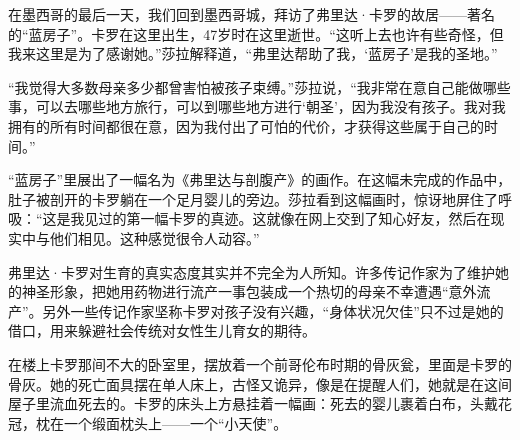 \documentclass[12pt,oneside]{book}
\begin{document}
\begin{bookref}[frametitle={\cite{好好告别}}]
在墨西哥的最后一天，我们回到墨西哥城，拜访了弗里达·卡罗的故居——著名的“蓝房子”。卡罗在这里出生，47岁时在这里逝世。“这听上去也许有些奇怪，但我来这里是为了感谢她。”莎拉解释道，“弗里达帮助了我，‘蓝房子’是我的圣地。”

“我觉得大多数母亲多少都曾害怕被孩子束缚。”莎拉说，“我非常在意自己能做哪些事，可以去哪些地方旅行，可以到哪些地方进行‘朝圣’，因为我没有孩子。我对我拥有的所有时间都很在意，因为我付出了可怕的代价，才获得这些属于自己的时间。”

“蓝房子”里展出了一幅名为《弗里达与剖腹产》的画作。在这幅未完成的作品中，肚子被剖开的卡罗躺在一个足月婴儿的旁边。莎拉看到这幅画时，惊讶地屏住了呼吸：“这是我见过的第一幅卡罗的真迹。这就像在网上交到了知心好友，然后在现实中与他们相见。这种感觉很令人动容。”

弗里达·卡罗对生育的真实态度其实并不完全为人所知。许多传记作家为了维护她的神圣形象，把她用药物进行流产一事包装成一个热切的母亲不幸遭遇“意外流产”。另外一些传记作家坚称卡罗对孩子没有兴趣，“身体状况欠佳”只不过是她的借口，用来躲避社会传统对女性生儿育女的期待。

在楼上卡罗那间不大的卧室里，摆放着一个前哥伦布时期的骨灰瓮，里面是卡罗的骨灰。她的死亡面具摆在单人床上，古怪又诡异，像是在提醒人们，她就是在这间屋子里流血死去的。卡罗的床头上方悬挂着一幅画：死去的婴儿裹着白布，头戴花冠，枕在一个缎面枕头上——一个“小天使”。

\end{bookref}
\end{document}
